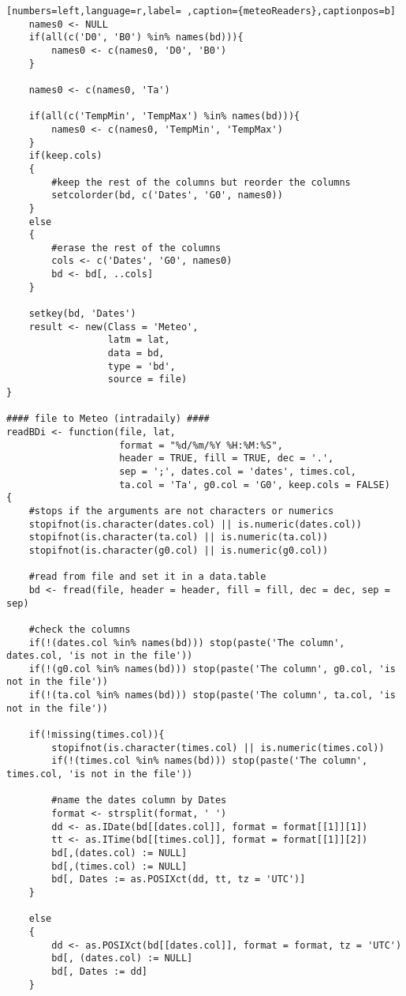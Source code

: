 \begin{lstlisting}[numbers=left,language=r,label= ,caption={meteoReaders},captionpos=b]
    names0 <- NULL
    if(all(c('D0', 'B0') %in% names(bd))){
        names0 <- c(names0, 'D0', 'B0')
    }

    names0 <- c(names0, 'Ta')

    if(all(c('TempMin', 'TempMax') %in% names(bd))){
        names0 <- c(names0, 'TempMin', 'TempMax')
    }
    if(keep.cols)
    {
        #keep the rest of the columns but reorder the columns
        setcolorder(bd, c('Dates', 'G0', names0))
    }
    else
    {
        #erase the rest of the columns
        cols <- c('Dates', 'G0', names0)
        bd <- bd[, ..cols]
    }

    setkey(bd, 'Dates')
    result <- new(Class = 'Meteo',
                  latm = lat,
                  data = bd,
                  type = 'bd',
                  source = file)
}

#### file to Meteo (intradaily) ####
readBDi <- function(file, lat,
                    format = "%d/%m/%Y %H:%M:%S",
                    header = TRUE, fill = TRUE, dec = '.',
                    sep = ';', dates.col = 'dates', times.col,
                    ta.col = 'Ta', g0.col = 'G0', keep.cols = FALSE)
{
    #stops if the arguments are not characters or numerics
    stopifnot(is.character(dates.col) || is.numeric(dates.col))
    stopifnot(is.character(ta.col) || is.numeric(ta.col))
    stopifnot(is.character(g0.col) || is.numeric(g0.col))

    #read from file and set it in a data.table
    bd <- fread(file, header = header, fill = fill, dec = dec, sep = sep)

    #check the columns
    if(!(dates.col %in% names(bd))) stop(paste('The column', dates.col, 'is not in the file'))
    if(!(g0.col %in% names(bd))) stop(paste('The column', g0.col, 'is not in the file'))
    if(!(ta.col %in% names(bd))) stop(paste('The column', ta.col, 'is not in the file'))

    if(!missing(times.col)){
        stopifnot(is.character(times.col) || is.numeric(times.col))
        if(!(times.col %in% names(bd))) stop(paste('The column', times.col, 'is not in the file'))

        #name the dates column by Dates
        format <- strsplit(format, ' ')
        dd <- as.IDate(bd[[dates.col]], format = format[[1]][1])
        tt <- as.ITime(bd[[times.col]], format = format[[1]][2])
        bd[,(dates.col) := NULL]
        bd[,(times.col) := NULL]
        bd[, Dates := as.POSIXct(dd, tt, tz = 'UTC')]
    }

    else
    {
        dd <- as.POSIXct(bd[[dates.col]], format = format, tz = 'UTC')
        bd[, (dates.col) := NULL]
        bd[, Dates := dd]
    }


\end{lstlisting}
